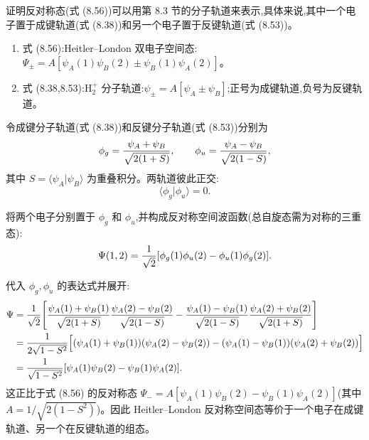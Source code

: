 \begin{question}
证明反对称态(式 (8.56))可以用第 8.3 节的分子轨道来表示,具体来说,其中一个电子置于成键轨道(式 (8.38))和另一个电子置于反键轨道(式 (8.53))。

\par\smallskip
{}
\begin{enumerate}[leftmargin=2.2em,itemsep=0.12em,topsep=0.12em,parsep=0pt]
\item 式 (8.56):Heitler--London 双电子空间态:$\Psi_\pm=A[\psi_A(1)\psi_B(2)\pm\psi_B(1)\psi_A(2)]$。
\item 式 (8.38,8.53):$\mathrm H_2^+$ 分子轨道:$\psi_\pm=A[\psi_A\pm\psi_B]$;正号为成键轨道,负号为反键轨道。
\end{enumerate}

\begin{solution}
令成键分子轨道(式 (8.38))和反键分子轨道(式 (8.53))分别为
\[
\phi_g={\psi_A+\psi_B\over\sqrt{2(1+S)}},\qquad
\phi_u={\psi_A-\psi_B\over\sqrt{2(1-S)}},
\]
其中 $S=\langle\psi_A|\psi_B\rangle$ 为重叠积分。两轨道彼此正交:
\[
\langle\phi_g|\phi_u\rangle=0.
\]

将两个电子分别置于 $\phi_g$ 和 $\phi_u$,并构成反对称空间波函数(总自旋态需为对称的三重态):
\[
\Psi(1,2)={1\over\sqrt2}[\phi_g(1)\phi_u(2)-\phi_u(1)\phi_g(2)].
\]

代入 $\phi_g,\phi_u$ 的表达式并展开:
\[
\begin{aligned}
\Psi&={1\over\sqrt2}\Bigg[
{\psi_A(1)+\psi_B(1)\over\sqrt{2(1+S)}}{\psi_A(2)-\psi_B(2)\over\sqrt{2(1-S)}}
-{\psi_A(1)-\psi_B(1)\over\sqrt{2(1-S)}}{\psi_A(2)+\psi_B(2)\over\sqrt{2(1+S)}}\Bigg]\\
&={1\over2\sqrt{1-S^2}}\Bigl[
(\psi_A(1)+\psi_B(1))(\psi_A(2)-\psi_B(2))
-(\psi_A(1)-\psi_B(1))(\psi_A(2)+\psi_B(2))\Bigr]\\
&={1\over\sqrt{1-S^2}}[\psi_A(1)\psi_B(2)-\psi_B(1)\psi_A(2)].
\end{aligned}
\]
这正比于式 (8.56) 的反对称态 $\Psi_-=A[\psi_A(1)\psi_B(2)-\psi_B(1)\psi_A(2)]$(其中 $A=1/\sqrt{2(1-S^2)}$)。因此 Heitler--London 反对称空间态等价于一个电子在成键轨道、另一个在反键轨道的组态。
\end{solution}
\end{question}

